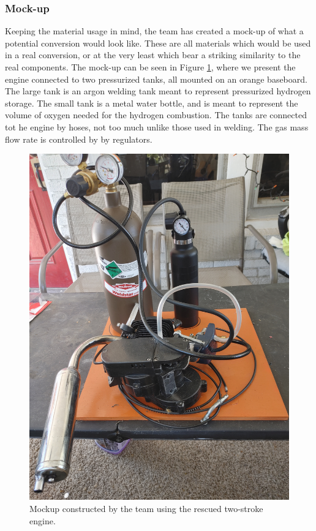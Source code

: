 \documentclass[conf]{new-aiaa}
\begin{document}
\subsubsection{Mock-up}

Keeping the material usage in mind, the team has created a mock-up of what a potential conversion would look like. These are all materials which would be used in a real conversion, or at the very least which bear a striking similarity to the real components. The mock-up can be seen in Figure \ref{fig:mockup}, where we present the engine connected to two pressurized tanks, all mounted on an orange baseboard. The large tank is an argon welding tank meant to represent pressurized hydrogen storage. The small tank is a metal water bottle, and is meant to represent the volume of oxygen needed for the hydrogen combustion. The tanks are connected tot he engine by hoses, not too much unlike those used in welding. The gas mass flow rate is controlled by by regulators.

\begin{figure}[H]
    \centering
    \includegraphics[width=1\textwidth]{Figures/mockup.jpg}
    \caption{Mockup constructed by the team using the rescued two-stroke engine.}
    \label{fig:mockup}
\end{figure}
\end{document}
